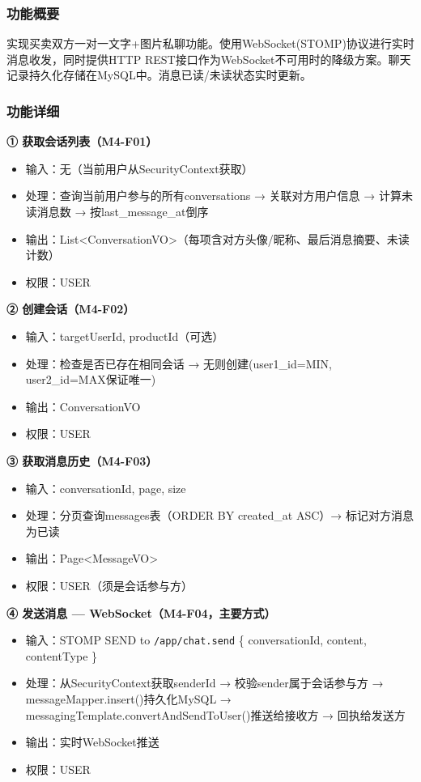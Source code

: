 \documentclass[12pt,a4paper]{ctexart}
\numberwithin{figure}{section}
\numberwithin{table}{section}
\begin{document}
\subsubsection{功能概要}

实现买卖双方一对一文字+图片私聊功能。使用WebSocket(STOMP)协议进行实时消息收发，同时提供HTTP REST接口作为WebSocket不可用时的降级方案。聊天记录持久化存储在MySQL中。消息已读/未读状态实时更新。

\subsubsection{功能详细}

\textbf{① 获取会话列表（M4-F01）}

\begin{itemize}
    \item 输入：无（当前用户从SecurityContext获取）
    \item 处理：查询当前用户参与的所有conversations → 关联对方用户信息 → 计算未读消息数 → 按last\_message\_at倒序
    \item 输出：List<ConversationVO>（每项含对方头像/昵称、最后消息摘要、未读计数）
    \item 权限：USER
\end{itemize}

\textbf{② 创建会话（M4-F02）}

\begin{itemize}
    \item 输入：targetUserId, productId（可选）
    \item 处理：检查是否已存在相同会话 → 无则创建(user1\_id=MIN, user2\_id=MAX保证唯一)
    \item 输出：ConversationVO
    \item 权限：USER
\end{itemize}

\textbf{③ 获取消息历史（M4-F03）}

\begin{itemize}
    \item 输入：conversationId, page, size
    \item 处理：分页查询messages表（ORDER BY created\_at ASC）→ 标记对方消息为已读
    \item 输出：Page<MessageVO>
    \item 权限：USER（须是会话参与方）
\end{itemize}

\textbf{④ 发送消息 --- WebSocket（M4-F04，主要方式）}

\begin{itemize}
    \item 输入：STOMP SEND to \verb|/app/chat.send| \{ conversationId, content, contentType \}
    \item 处理：从SecurityContext获取senderId → 校验sender属于会话参与方 → messageMapper.insert()持久化MySQL → messagingTemplate.convertAndSendToUser()推送给接收方 → 回执给发送方
    \item 输出：实时WebSocket推送
    \item 权限：USER
\end{itemize}
\end{document}
